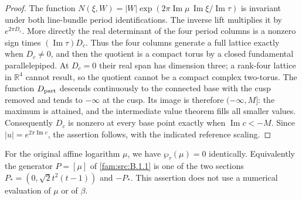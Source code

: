 \begin{proof}
The function $N(\xi,W)=|W|\exp(2\pi\operatorname{Im}\mu\,\operatorname{Im}\xi/\operatorname{Im}\tau)$ is invariant under both line-bundle period identifications. The inverse lift multiplies it by $e^{2\pi D_c}$. More directly the real determinant of the four period columns is a nonzero sign times $(\operatorname{Im}\tau)D_c$. Thus the four columns generate a full lattice exactly when $D_c\ne0$, and then the quotient is a compact torus by a closed fundamental parallelepiped. At $D_c=0$ their real span has dimension three; a rank-four lattice in $\mathbb R^4$ cannot result, so the quotient cannot be a compact complex two-torus. The function $D_{\rm part}$ descends continuously to the connected base with the cusp removed and tends to $-\infty$ at the cusp. Its image is therefore $(-\infty,M]$: the maximum is attained, and the intermediate value theorem fills all smaller values. Consequently $D_c$ is nonzero at every base point exactly when $\operatorname{Im}c<-M$. Since $|u|=e^{2\pi\operatorname{Im}c}$, the assertion follows, with the indicated reference scaling.
\end{proof}

\begin{proposition}\label{fam:src:B.1.3}\label{fam:st:B.1.3}
For the original affine logarithm $\mu$, we have $\wp_\tau(\mu)=0$ identically. Equivalently the generator $P=[\mu]$ of \ref{fam:src:B.1.1} is one of the two sections $P_*=(0,\sqrt2t^2(t-1))$ and $-P_*$. This assertion does not use a numerical evaluation of $\mu$ or of $\beta$.
\end{proposition}

